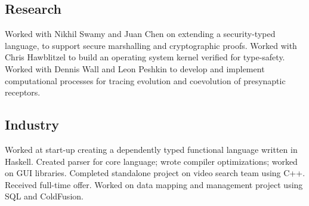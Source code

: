 \documentclass[10pt,a4paper]{moderncv}
\begin{document}
\subsection{Research}
  {Worked with Nikhil Swamy and Juan Chen on extending a security-typed language, to support secure marshalling and cryptographic proofs.}
  {Worked with Chris Hawblitzel to build an operating system kernel verified for type-safety.}
  {Worked with Dennis Wall and Leon Peshkin to develop and implement computational processes for tracing evolution and coevolution of presynaptic receptors.}
\subsection{Industry}
  {}{Worked at start-up creating a dependently typed functional language written in Haskell.  Created parser for core language; wrote compiler optimizations; worked on GUI libraries.}
  {Completed standalone project on video search team using C++.  Received full-time offer.}
  {}{Worked on data mapping and management project using SQL and ColdFusion.}

\newpage
\end{document}
